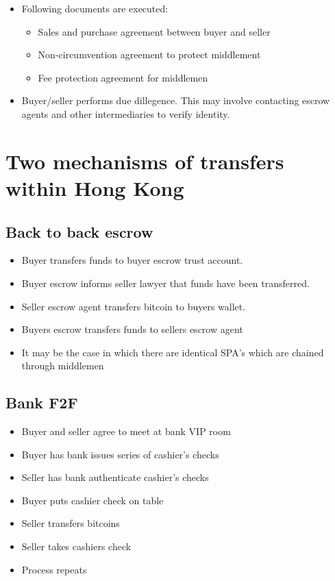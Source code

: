 \documentclass[10pt]{article}
\begin{document}
\begin{itemize}
\item Following documents are executed:

\begin{itemize}
\item Sales and purchase agreement between buyer and seller
\item Non-circumvention agreement to protect middlement
\item Fee protection agreement for middlemen
\end{itemize}

\item Buyer/seller performs due dillegence.  This may involve
  contacting escrow agents and other intermediaries to verify
  identity.
\end{itemize}
  

\section{Two mechanisms of transfers within Hong Kong}

\subsection{Back to back escrow}

\begin{itemize}
\item Buyer transfers funds to buyer escrow trust account.
\item Buyer escrow informs seller lawyer that funds have been transferred.
\item Seller escrow agent transfers bitcoin to buyers wallet.
\item Buyers escrow transfers funds to sellers escrow agent
\item It may be the case in which there are identical SPA's which are
  chained through middlemen
\end{itemize}

\subsection{Bank F2F}

\begin{itemize}
\item Buyer and seller agree to meet at bank VIP room
\item Buyer has bank issues series of cashier’s checks
\item Seller has bank authenticate cashier’s checks
\item Buyer puts cashier check on table
\item Seller transfers bitcoins
\item Seller takes cashiers check
\item Process repeats
\end{itemize}
\end{document}
